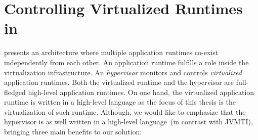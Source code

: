 




\section{Controlling Virtualized Runtimes in \Vtt} \label{sec:virtualization_overview}

\Vtt presents an architecture where multiple application runtimes co-exist independently from each other. An application runtime fulfills a role inside the virtualization infrastructure. An \emph{hypervisor} monitors and controls \emph{virtualized} application runtimes. Both the virtualized runtime and the hypervisor are full-fledged high-level application runtimes. On one hand, the virtualized application runtime is written in a high-level language as the focus of this thesis is the virtualization of such runtime. Although, we would like to emphasize that the hypervisor is as well written in a high-level language~(in contrast with \eg JVMTI\cite{JVMPI}), bringing three main benefits to our solution:

